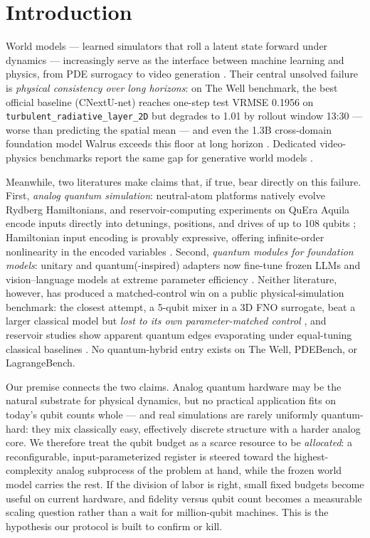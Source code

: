 \documentclass{article}
\begin{document}
\section{Introduction}
\label{sec:intro}

World models --- learned simulators that roll a latent state forward under
dynamics --- increasingly serve as the interface between machine learning and
physics, from PDE surrogacy to video generation
\citep{ohana2024thewell,mccabe2025walrus,gao2026lingbotworld}. Their central
unsolved failure is \emph{physical consistency over long horizons}: on The
Well benchmark, the best official baseline (CNextU-net) reaches one-step test
VRMSE 0.1956 on \texttt{turbulent\_radiative\_layer\_2D} but degrades to 1.01
by rollout window 13:30 --- worse than predicting the spatial mean --- and even
the 1.3B cross-domain foundation model Walrus exceeds this floor at long
horizon \citep{ohana2024thewell,mccabe2025walrus}. Dedicated video-physics
benchmarks report the same gap for generative world models
\citep{motamed2025physicsiq,li2025worldmodelbench}.

Meanwhile, two literatures make claims that, if true, bear directly on this
failure. First, \emph{analog quantum simulation}: neutral-atom platforms
natively evolve Rydberg Hamiltonians, and reservoir-computing experiments on
QuEra Aquila encode inputs directly into detunings, positions, and drives of
up to 108 qubits \citep{kornjaca2024aquila}; Hamiltonian input encoding is
provably expressive, offering infinite-order nonlinearity in the encoded
variables \citep{xia2026magicqrc}. Second, \emph{quantum modules for
foundation models}: unitary and quantum(-inspired) adapters now fine-tune
frozen LLMs and vision--language models at extreme parameter efficiency
\citep{koikeakino2025quantumpeft,raj2025quic,aizpurua2026cayley,zhao2026mqadapter}.
Neither literature, however, has produced a matched-control win on a public
physical-simulation benchmark: the closest attempt, a 5-qubit mixer in a 3D
FNO surrogate, beat a larger classical model but \emph{lost to its own
parameter-matched control} \citep{papierz2026hqlpfno}, and reservoir studies
show apparent quantum edges evaporating under equal-tuning classical baselines
\citep{pandey2026qrcbaselines}. No quantum-hybrid entry exists on The Well,
PDEBench, or LagrangeBench.

Our premise connects the two claims. Analog quantum hardware may be the
natural substrate for physical dynamics, but no practical application fits on
today's qubit counts whole --- and real simulations are rarely uniformly
quantum-hard: they mix classically easy, effectively discrete structure with a
harder analog core. We therefore treat the qubit budget as a scarce resource
to be \emph{allocated}: a reconfigurable, input-parameterized register is
steered toward the highest-complexity analog subprocess of the problem at
hand, while the frozen world model carries the rest. If the division of labor
is right, small fixed budgets become useful on current hardware, and fidelity
versus qubit count becomes a measurable scaling question rather than a wait
for million-qubit machines. This is the hypothesis our protocol is built to
confirm or kill.
\end{document}
